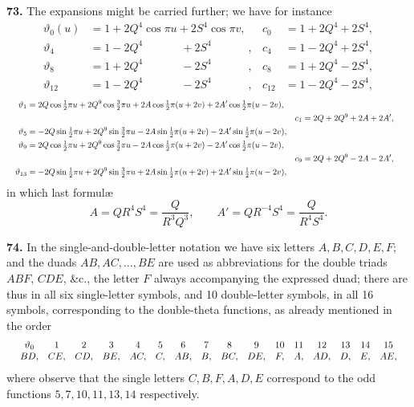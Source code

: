 \documentclass[11pt]{article}
\begin{document}
\medskip
\textbf{73.} The expansions might be carried further; we have for instance
\[
\begin{aligned}
\vartheta_0(u) &= 1 + 2Q^4\cos\pi u + 2S^4\cos\pi v, & c_0 &= 1 + 2Q^4 + 2S^4,\\
\vartheta_4 &= 1 - 2Q^4\,\phantom{\cos\pi u}\, + 2S^4\,\phantom{\cos\pi v}\,, & c_4 &= 1 - 2Q^4 + 2S^4,\\
\vartheta_8 &= 1 + 2Q^4\,\phantom{\cos\pi u}\, - 2S^4\,\phantom{\cos\pi v}\,, & c_8 &= 1 + 2Q^4 - 2S^4,\\
\vartheta_{12} &= 1 - 2Q^4\,\phantom{\cos\pi u}\, - 2S^4\,\phantom{\cos\pi v}\,, & c_{12} &= 1 - 2Q^4 - 2S^4,
\end{aligned}
\]
\[
\resizebox{\textwidth}{!}{$\displaystyle
\begin{aligned}
\vartheta_1 &= 2Q\cos\tfrac{1}{2}\pi u + 2Q^9\cos\tfrac{3}{2}\pi u + 2A\cos\tfrac{1}{2}\pi(u+2v) + 2A'\cos\tfrac{1}{2}\pi(u-2v),\\
&& c_1 &= 2Q + 2Q^9 + 2A + 2A',\\
\vartheta_5 &= -2Q\sin\tfrac{1}{2}\pi u + 2Q^9\sin\tfrac{3}{2}\pi u - 2A\sin\tfrac{1}{2}\pi(u+2v) - 2A'\sin\tfrac{1}{2}\pi(u-2v),\\
\vartheta_9 &= 2Q\cos\tfrac{1}{2}\pi u + 2Q^9\cos\tfrac{3}{2}\pi u - 2A\cos\tfrac{1}{2}\pi(u+2v) - 2A'\cos\tfrac{1}{2}\pi(u-2v),\\
&& c_9 &= 2Q + 2Q^9 - 2A - 2A',\\
\vartheta_{13} &= -2Q\sin\tfrac{1}{2}\pi u + 2Q^9\sin\tfrac{3}{2}\pi u + 2A\sin\tfrac{1}{2}\pi(u+2v) + 2A'\sin\tfrac{1}{2}\pi(u-2v),
\end{aligned}$}
\]
in which last formul\ae
\[
A = QR^4 S^4 = \frac{Q}{R^3 Q^3},\qquad A' = QR^{-4} S^4 = \frac{Q}{R^4 S^4}.
\]

\medskip
\textbf{74.} In the single-and-double-letter notation we have six letters $A,B,C,D,E,F$; and the duads $AB, AC, \ldots, BE$ are used as abbreviations for the double triads $ABF$, $CDE$, \&c., the letter $F$ always accompanying the expressed duad; there are thus in all six single-letter symbols, and 10 double-letter symbols, in all 16 symbols, corresponding to the double-theta functions, as already mentioned in the order
\[
\resizebox{\textwidth}{!}{$\displaystyle
\begin{array}{ccccccccccccccccc}
\vartheta_0 & 1 & 2 & 3 & 4 & 5 & 6 & 7 & 8 & 9 & 10 & 11 & 12 & 13 & 14 & 15\\
BD, & CE, & CD, & BE, & AC, & C, & AB, & B, & BC, & DE, & F, & A, & AD, & D, & E, & AE,
\end{array}$}
\]
where observe that the single letters $C,B,F,A,D,E$ correspond to the odd functions $5, 7, 10, 11, 13, 14$ respectively.
\end{document}

